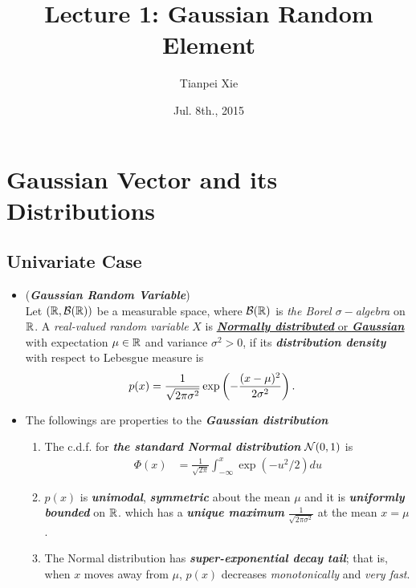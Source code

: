\documentclass[11pt]{article}
\begin{document}
\title{Lecture 1: Gaussian Random Element}
\author{ Tianpei Xie}
\date{ Jul. 8th., 2015 }
\maketitle
\tableofcontents
\newpage
\section{Gaussian Vector and its Distributions}
\subsection{Univariate Case}
\begin{itemize}
\item \begin{definition} (\emph{\textbf{Gaussian Random Variable}})\\
Let $({\mathbb R}, {\mathcal B}({\mathbb R}))$ be a measurable space, where ${\mathcal B}({\mathbb R})$ is \emph{the Borel $\sigma-$algebra} on ${\mathbb R}$. A \emph{real-valued random variable} $X$ is \underline{\emph{\textbf{Normally distributed}} or \emph{\textbf{Gaussian}}} with expectation $\mu \in {\mathbb R}$ and variance $\sigma^2 > 0$, if its \emph{\textbf{distribution density}} with respect to Lebesgue measure  is 
\begin{align*}
p(x) &= \frac{1}{\sqrt{2\pi\sigma^{2}}}\exp\left(-\frac{(x - \mu)^{2}}{2\sigma^{2}}\right).
\end{align*} 
\end{definition}

\item \begin{remark}
The followings are properties to the \emph{\textbf{Gaussian distribution}}
\begin{enumerate}
\item The c.d.f. for \emph{\textbf{the standard Normal distribution}} ${\mathcal N}(0, 1)$ is 
\begin{align*}
\Phi(x) &= \frac{1}{\sqrt{2\pi}}\int_{-\infty}^{x}\exp(-u^{2}/2)du
\end{align*}

\item $p(x)$ is \emph{\textbf{unimodal}}, \emph{\textbf{symmetric}} about the mean $\mu$ and it is \emph{\textbf{uniformly bounded}} on ${\mathbb R}$. which has a \emph{\textbf{unique maximum}} $\frac{1}{\sqrt{2\pi\sigma^{2}}}$ at the mean $x=\mu$.

\item The Normal distribution has \emph{\textbf{super-exponential decay tail}}; that is, when $x$ moves away from $\mu$, $p(x)$ decreases \emph{monotonically} and \emph{very fast}. 


\end{enumerate}
\end{remark}
\end{itemize}
\end{document}
